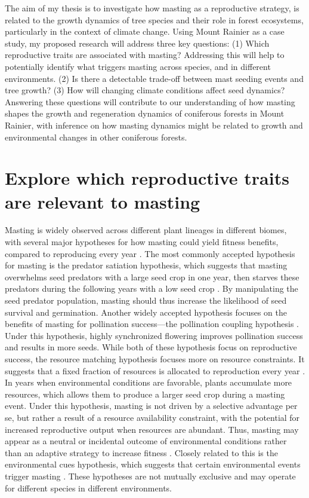 \documentclass[11pt,letter]{article}
\begin{document}
The aim of my thesis is to investigate how masting as a reproductive strategy, is related to the growth dynamics of tree species and their role in forest ecosystems, particularly in the context of climate change. Using Mount Rainier as a case study, my proposed research will address three key questions: (1) Which reproductive traits are associated with masting? Addressing this will help to potentially identify what triggers masting across species, and in different environments. (2) Is there a detectable trade-off between mast seeding events and tree growth? (3) How will changing climate conditions affect seed dynamics? Answering these questions will contribute to our understanding of how masting shapes the growth and regeneration dynamics of coniferous forests in Mount Rainier, with inference on how masting dynamics might be related to growth and environmental changes in other coniferous forests.

\section{Explore which reproductive traits are relevant to masting}
Masting is widely observed across different plant lineages in different biomes, with several major hypotheses for how masting could yield fitness benefits, compared to reproducing every year \citep{koenig2021brief, waller1979models}. The most commonly accepted hypothesis for masting is the predator satiation hypothesis, which suggests that masting overwhelms seed predators with a large seed crop in one year, then starves these predators during the following years with a low seed crop \citep{janzen1971seed}. By manipulating the seed predator population, masting should thus increase the likelihood of seed survival and germination. Another widely accepted hypothesis focuses on the benefits of masting for pollination success---the pollination coupling hypothesis \citep{crone2014resource}. Under this hypothesis, highly synchronized flowering improves pollination success and results in more seeds. While both of these hypothesis focus on reproductive success, the resource matching hypothesis focuses more on resource constraints. It suggests that a fixed fraction of resources is allocated to reproduction every year \citep{kelly1994evolutionary}. In years when environmental conditions are favorable, plants accumulate more resources, which allows them to produce a larger seed crop during a masting event. Under this hypothesis, masting is not driven by a selective advantage per se, but rather a result of a resource availability constraint, with the potential for increased reproductive output when resources are abundant. Thus, masting may appear as a neutral or incidental outcome of environmental conditions rather than an adaptive strategy to increase fitness \citep{isagi1997does}. Closely related to this is the environmental cues hypothesis, which suggests that certain environmental events trigger masting \citep{pearse2016mechanisms}. These hypotheses are not mutually exclusive and may operate for different species in different environments.
\end{document}
